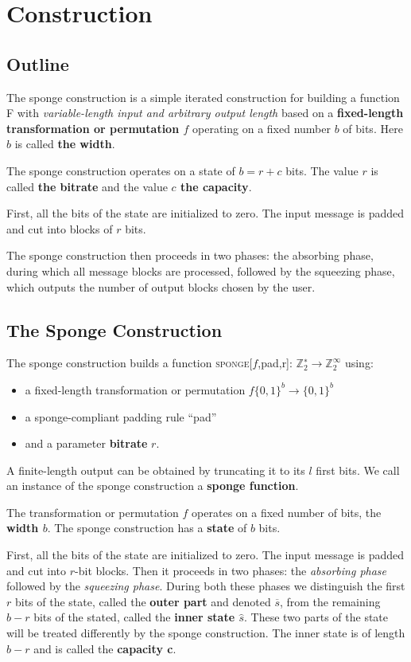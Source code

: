 \section{Construction}\label{sec:Sponge}
\subsection{Outline}
The sponge construction is a simple iterated construction for building a function F with \emph{variable-length input and arbitrary output length} based on a \textbf{fixed-length transformation or permutation $f$} operating on a fixed number $b$ of bits. Here $b$ is called \textbf{the width}.

The sponge construction operates on a state of $b = r + c$ bits. The value $r$ is called \textbf{the bitrate} and the value \textbf{$c$ the capacity}.

First, all the bits of the state are initialized to zero. The input message is padded and cut into blocks of $r$ bits. 

The sponge construction then proceeds in two phases: the absorbing phase, during which all message blocks are processed, followed by the squeezing phase, which outputs the number of output blocks chosen by the user.


\subsection{The Sponge Construction}\label{section:sponge}
The sponge construction builds a function \textsc{sponge}[$f$,pad,r]: $\mathbb{Z}_2^∗ \rightarrow \mathbb{Z}_2^\infty$ using:
\begin{itemize}[label=\textperiodcentered,nolistsep]
\item a fixed-length transformation or permutation $f{\{0,1\}}^b \rightarrow {\{0,1\}}^b$
\item a sponge-compliant padding rule “pad”
\item and a parameter \textbf{bitrate} $r$.
\end{itemize}
A finite-length output can be obtained by truncating it to its $l$ first bits. We call an instance of the sponge construction a \textbf{sponge function}.

The transformation or permutation $f$ operates on a fixed number of bits, the \textbf{width $b$}. The sponge construction has a \textbf{state} of $b$ bits. 

First, all the bits of the state are initialized to zero. The input message is padded and cut into $r$-bit blocks. Then it proceeds in two phases: the \emph{absorbing phase} followed by the \emph{squeezing phase}. During both these phases we distinguish the first $r$ bits of the state, called the \textbf{outer part} and denoted \textbf{$\overline{s}$}, from the remaining $b − r$ bits of the stated, called the \textbf{inner state $\widehat{s}$}. These two parts of the state will be treated differently by the sponge construction.  The inner state is of length $b − r$ and is called the \textbf{capacity c}. 

